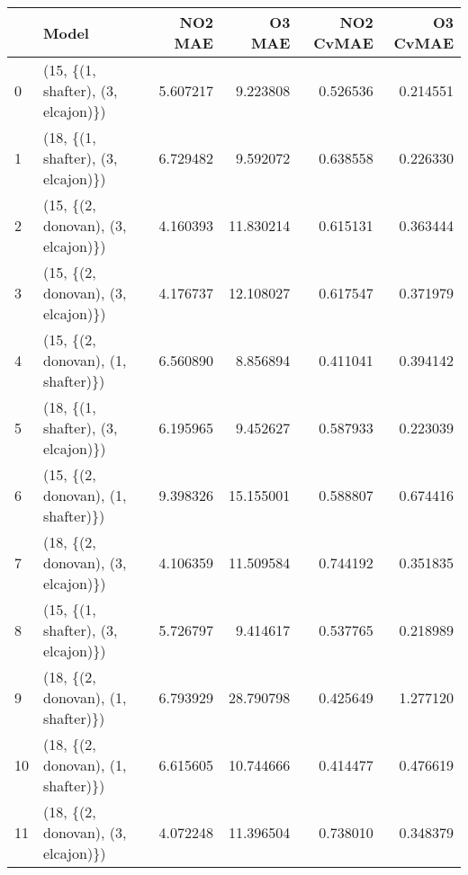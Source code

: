 \begin{tabular}{llrrrr}
\toprule
{} &                               Model &   NO2 MAE &     O3 MAE &  NO2 CvMAE &  O3 CvMAE \\
\midrule
0  &  (15, \{(1, shafter), (3, elcajon)\}) &  5.607217 &   9.223808 &   0.526536 &  0.214551 \\
1  &  (18, \{(1, shafter), (3, elcajon)\}) &  6.729482 &   9.592072 &   0.638558 &  0.226330 \\
2  &  (15, \{(2, donovan), (3, elcajon)\}) &  4.160393 &  11.830214 &   0.615131 &  0.363444 \\
3  &  (15, \{(2, donovan), (3, elcajon)\}) &  4.176737 &  12.108027 &   0.617547 &  0.371979 \\
4  &  (15, \{(2, donovan), (1, shafter)\}) &  6.560890 &   8.856894 &   0.411041 &  0.394142 \\
5  &  (18, \{(1, shafter), (3, elcajon)\}) &  6.195965 &   9.452627 &   0.587933 &  0.223039 \\
6  &  (15, \{(2, donovan), (1, shafter)\}) &  9.398326 &  15.155001 &   0.588807 &  0.674416 \\
7  &  (18, \{(2, donovan), (3, elcajon)\}) &  4.106359 &  11.509584 &   0.744192 &  0.351835 \\
8  &  (15, \{(1, shafter), (3, elcajon)\}) &  5.726797 &   9.414617 &   0.537765 &  0.218989 \\
9  &  (18, \{(2, donovan), (1, shafter)\}) &  6.793929 &  28.790798 &   0.425649 &  1.277120 \\
10 &  (18, \{(2, donovan), (1, shafter)\}) &  6.615605 &  10.744666 &   0.414477 &  0.476619 \\
11 &  (18, \{(2, donovan), (3, elcajon)\}) &  4.072248 &  11.396504 &   0.738010 &  0.348379 \\
\bottomrule
\end{tabular}
